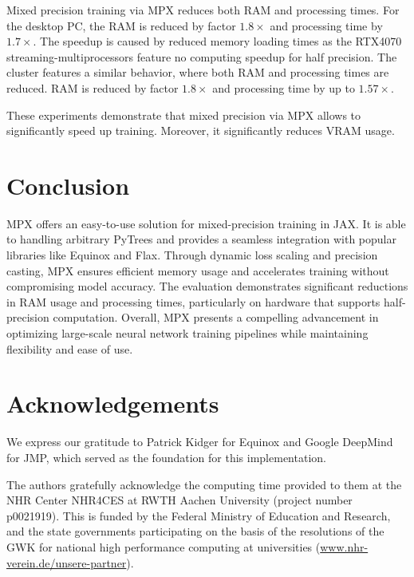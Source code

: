 \documentclass[10pt, a4paper, logo, onecolumn, internal, copyright]{dsme}
\newcommand{\mpx}{\textsc{MPX}}
\begin{document}
Mixed precision training via \mpx{} reduces both RAM and processing times.
For the desktop PC, the RAM is reduced by factor $1.8\times$ and processing time by $1.7\times$.
The speedup is caused by reduced memory loading times as the RTX4070 streaming-multiprocessors feature no computing speedup for half precision.
The cluster features a similar behavior, where both RAM and processing times are reduced.
RAM is reduced by factor $1.8\times$ and processing time by up to $1.57\times$.

These experiments demonstrate that mixed precision via \mpx{} allows to significantly speed up training.
Moreover, it significantly reduces VRAM usage.


\section{Conclusion}

\mpx{} offers an easy-to-use solution for mixed-precision training in JAX.
It is able to handling arbitrary PyTrees and provides a seamless integration with popular libraries like Equinox and Flax. 
Through dynamic loss scaling and precision casting, MPX ensures efficient memory usage and accelerates training without compromising model accuracy. 
The evaluation demonstrates significant reductions in RAM usage and processing times, particularly on hardware that supports half-precision computation. 
Overall, MPX presents a compelling advancement in optimizing large-scale neural network training pipelines while maintaining flexibility and ease of use.


\section{Acknowledgements}
We express our gratitude to Patrick Kidger for Equinox and Google DeepMind for JMP, which served as the foundation for this implementation.

The authors gratefully acknowledge the computing time provided to them at the NHR Center NHR4CES at RWTH Aachen University (project number p0021919). This is funded by the Federal Ministry of Education and Research, and the state governments participating on the basis of the resolutions of the GWK for national high performance computing at universities (\url{www.nhr-verein.de/unsere-partner}).






\end{document}
